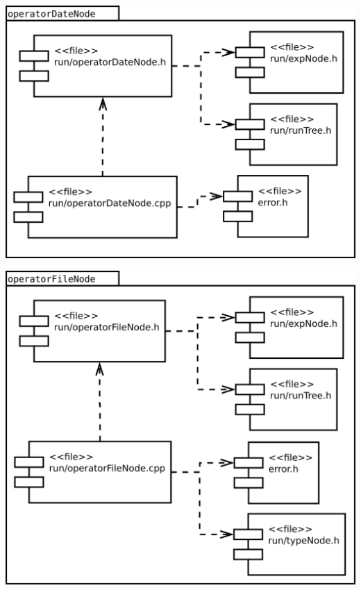 \begin{multicols}{2}
\begin{center}
\includegraphics[scale=0.3]{files_arquitecture/operatorDateNode.png} \\
\end{center}
\begin{center}
\includegraphics[scale=0.3]{files_arquitecture/operatorFileNode.png} \\
\end{center}
\end{multicols}


